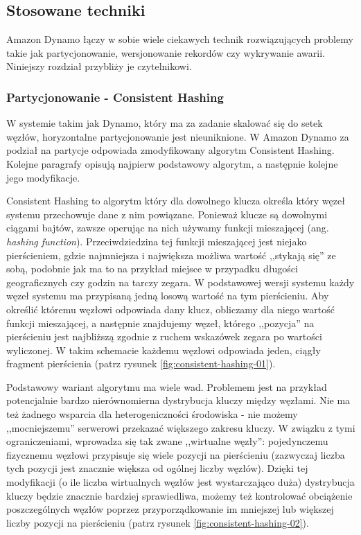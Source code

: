 \subsection*{Stosowane techniki}
\label{sec:dynamo-techniki}

Amazon Dynamo łączy w sobie wiele ciekawych technik rozwiązujących problemy takie jak partycjonowanie, wersjonowanie rekordów czy wykrywanie awarii.
Niniejszy rozdział przybliży je czytelnikowi.

\subsubsection*{Partycjonowanie - Consistent Hashing} 
\label{sec:dynamo-consistent-hashing}

W systemie takim jak Dynamo, który ma za zadanie skalować się do setek węzłów, horyzontalne partycjonowanie jest nieuniknione.
W Amazon Dynamo za podział na partycje odpowiada zmodyfikowany algorytm Consistent Hashing.
Kolejne paragrafy opisują najpierw podstawowy algorytm, a następnie kolejne jego modyfikacje.

Consistent Hashing to algorytm który dla dowolnego klucza określa który węzeł systemu przechowuje dane z nim powiązane.
Ponieważ klucze są dowolnymi ciągami bajtów, zawsze operując na nich używamy funkcji mieszającej (ang. \emph{hashing function}).
Przeciwdziedzina tej funkcji mieszającej jest niejako pierścieniem, gdzie najmniejsza i największa możliwa wartość ,,stykają się'' ze sobą, podobnie jak ma to na przykład miejsce w przypadku długości geograficznych czy godzin na tarczy zegara.
W podstawowej wersji systemu każdy węzeł systemu ma przypisaną jedną losową wartość na tym pierścieniu.
Aby określić któremu węzłowi odpowiada dany klucz, obliczamy dla niego wartość funkcji mieszającej, a następnie znajdujemy węzeł, którego ,,pozycja'' na pierścieniu jest najbliższą zgodnie z ruchem wskazówek zegara po wartości wyliczonej.
W takim schemacie każdemu węzłowi odpowiada jeden, ciągły fragment pierścienia (patrz rysunek \ref{fig:consistent-hashing-01}).


Podstawowy wariant algorytmu ma wiele wad.
Problemem jest na przykład potencjalnie bardzo nierównomierna dystrybucja kluczy między węzłami.
Nie ma też żadnego wsparcia dla heterogeniczności środowiska - nie możemy ,,mocniejszemu'' serwerowi przekazać większego zakresu kluczy.
W związku z tymi ograniczeniami, wprowadza się tak zwane ,,wirtualne węzły'': pojedynczemu fizycznemu węzłowi przypisuje się wiele pozycji na pierścieniu (zazwyczaj liczba tych pozycji jest znacznie większa od ogólnej liczby węzłów).
Dzięki tej modyfikacji (o ile liczba wirtualnych węzłów jest wystarczająco duża) dystrybucja kluczy będzie znacznie bardziej sprawiedliwa, możemy też kontrolować obciążenie poszczególnych węzłów poprzez przyporządkowanie im mniejszej lub większej liczby pozycji na pierścieniu (patrz rysunek \ref{fig:consistent-hashing-02}).

